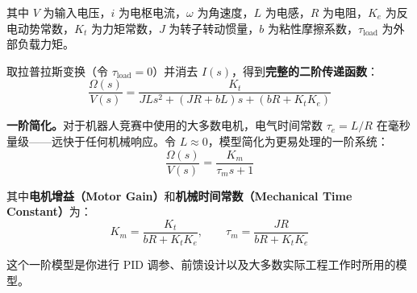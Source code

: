 其中 $V$ 为输入电压，$i$ 为电枢电流，$\omega$ 为角速度，$L$ 为电感，$R$ 为电阻，$K_e$ 为反电动势常数，$K_t$ 为力矩常数，$J$ 为转子转动惯量，$b$ 为粘性摩擦系数，$\tau_{\text{load}}$ 为外部负载力矩。

取拉普拉斯变换（令 $\tau_{\text{load}} = 0$）并消去 $I(s)$，得到\textbf{完整的二阶传递函数}：
\begin{equation}
\frac{\Omega(s)}{V(s)} = \frac{K_t}{JLs^2 + (JR + bL)s + (bR + K_t K_e)}
\end{equation}

\textbf{一阶简化。}对于机器人竞赛中使用的大多数电机，电气时间常数 $\tau_e = L/R$ 在毫秒量级——远快于任何机械响应。令 $L \approx 0$，模型简化为更易处理的一阶系统：
\begin{equation}
\frac{\Omega(s)}{V(s)} = \frac{K_m}{\tau_m s + 1}
\end{equation}

其中\textbf{电机增益（Motor Gain）}和\textbf{机械时间常数（Mechanical Time Constant）}为：
\begin{equation}
K_m = \frac{K_t}{bR + K_t K_e}, \qquad \tau_m = \frac{JR}{bR + K_t K_e}
\end{equation}

这个一阶模型是你进行 PID 调参、前馈设计以及大多数实际工程工作时所用的模型。

